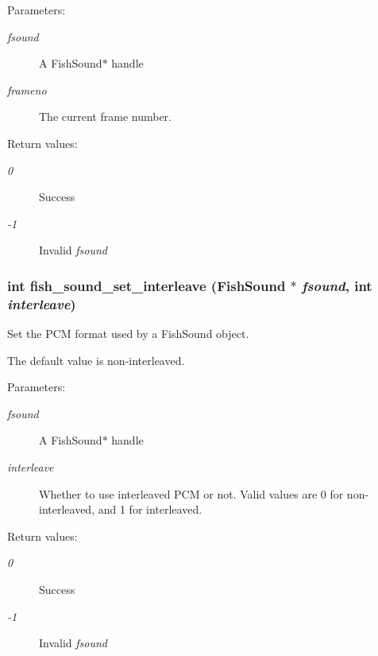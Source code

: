 \begin{Desc}
\item[Parameters:]
\begin{description}
\item[{\em fsound}]A Fish\-Sound$\ast$ handle \item[{\em frameno}]The current frame number. \end{description}
\end{Desc}
\begin{Desc}
\item[Return values:]
\begin{description}
\item[{\em 0}]Success \item[{\em -1}]Invalid {\em fsound\/} \end{description}
\end{Desc}
\subsubsection{\setlength{\rightskip}{0pt plus 5cm}int fish\_\-sound\_\-set\_\-interleave ({\bf Fish\-Sound} $\ast$ {\em fsound}, int {\em interleave})}\label{fishsound_8h_a14}


Set the PCM format used by a Fish\-Sound object. 

The default value is non-interleaved. \begin{Desc}
\item[Parameters:]
\begin{description}
\item[{\em fsound}]A Fish\-Sound$\ast$ handle \item[{\em interleave}]Whether to use interleaved PCM or not. Valid values are 0 for non-interleaved, and 1 for interleaved. \end{description}
\end{Desc}
\begin{Desc}
\item[Return values:]
\begin{description}
\item[{\em 0}]Success \item[{\em -1}]Invalid {\em fsound\/} \end{description}
\end{Desc}
